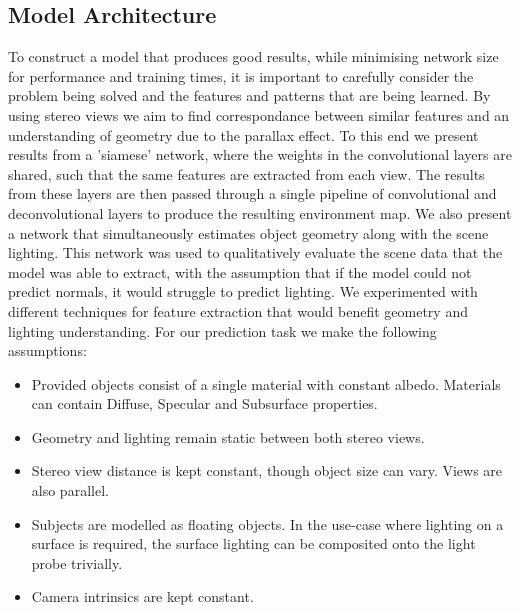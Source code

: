 \documentclass[ %
                    author={Gavin Parker},
                supervisor={Dr. Neill Campbell},
                    degree={MEng},
                     title={Deep Siamese Networks for Illumination Estimation from Stereo Images},
                  subtitle={},
                      type={research},
                      year={2018} ]{dissertation}
\begin{document}
\subsection{Model Architecture}
To construct a model that produces good results, while minimising network size for performance and training times, it is important to carefully consider the problem being solved and the features and patterns that are being learned. By using stereo views we aim to find correspondance between similar features and an understanding of geometry due to the parallax effect. To this end we present results from a 'siamese' network, where the weights in the convolutional layers are shared, such that the same features are extracted from each view. The results from these layers are then passed through a single pipeline of convolutional and deconvolutional layers to produce the resulting environment map.
\newline
{}
We also present a network that simultaneously estimates object geometry along with the scene lighting. This network was used to qualitatively evaluate the scene data that the model was able to extract, with the assumption that if the model could not predict normals, it would struggle to predict lighting. We experimented with different techniques for feature extraction that would benefit geometry and lighting understanding.
\newline
For our prediction task we make the following assumptions:
\begin{itemize}
\item Provided objects consist of a single material with constant albedo. Materials can contain Diffuse, Specular and Subsurface properties.
\item Geometry and lighting remain static between both stereo views.
\item Stereo view distance is kept constant, though object size can vary. Views are also parallel.
\item Subjects are modelled as floating objects. In the use-case where lighting on a surface is required, the surface lighting can be composited onto the light probe trivially.
\item Camera intrinsics are kept constant.
\end{itemize}
\end{document}
